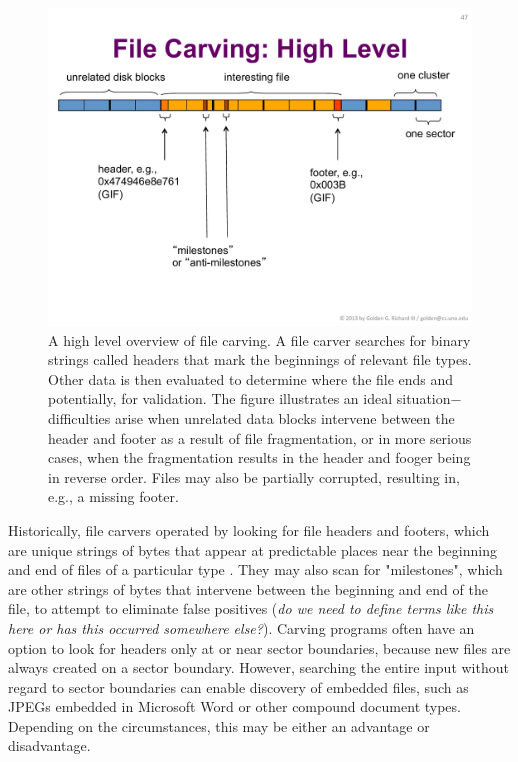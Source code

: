 \begin{figure}[ht]
\begin{center}
\includegraphics[width=140mm]{ch-carving/carvingoverview.pdf}
\end{center}
\caption{A high level overview of file carving.  A file carver searches for binary strings called headers that mark the beginnings of relevant file types.  Other data is then evaluated to determine where the file ends and potentially, for validation.  The figure illustrates an ideal situation$-$difficulties arise when unrelated data blocks intervene between the header and footer as a result of file fragmentation, or in more serious cases, when the fragmentation results in the header and fooger being in reverse order.  Files may also be partially corrupted, resulting in, e.g., a missing footer.}
\label{fig:carvingoverview}
\end{figure}


Historically, file carvers operated by looking for file headers and footers, which are unique strings of bytes that appear at predictable places near the beginning and end of files of a particular type \cite{Foremost, Scalpel}.  They may also scan for "milestones", which are other strings of bytes that intervene between the beginning and end of the file, to attempt to eliminate false positives (\emph{do we need to define terms like this here or has this occurred somewhere else?}).  Carving programs often have an option to look for headers only at or near sector boundaries, because new files are always created on a sector boundary.  However, searching the entire input without regard to sector boundaries can enable discovery of embedded files, such as JPEGs embedded in Microsoft Word or other compound document types.  Depending on the circumstances, this may be either an advantage or disadvantage.  

